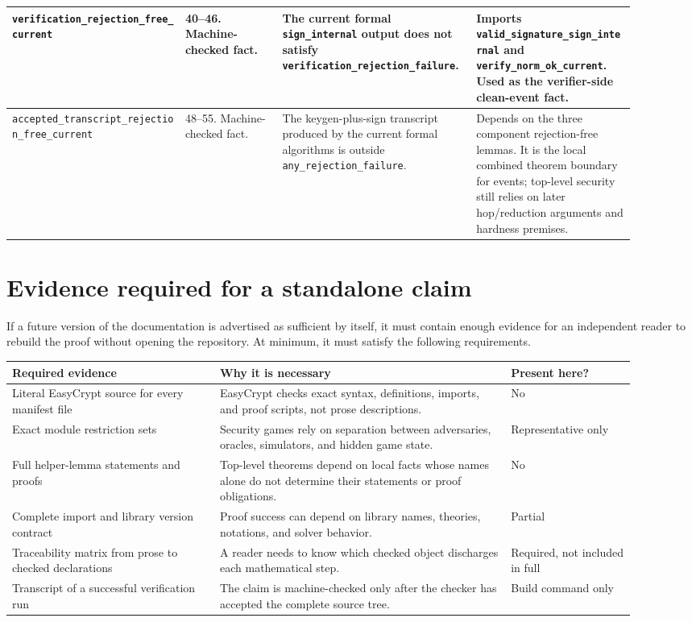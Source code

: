 \documentclass[11pt]{report}
\DeclareRobustCommand{\ec}[1]{\ifmmode\text{\nolinkurl{#1}}\else\nolinkurl{#1}\fi}
\theoremstyle{definition}
\theoremstyle{plain}
\begin{document}
{\begin{longtable}{p{0.25\linewidth}p{0.14\linewidth}p{0.28\linewidth}p{0.23\linewidth}}
\midrule
\ec{verification\_rejection\_free\_current} &
40--46. Machine-checked fact. &
The current formal \ec{sign\_internal} output does not satisfy
\ec{verification\_rejection\_failure}. &
Imports \ec{valid\_signature\_sign\_internal} and
\ec{verify\_norm\_ok\_current}.  Used as the verifier-side clean-event fact. \\
\midrule
\ec{accepted\_transcript\_rejection\_free\_current} &
48--55. Machine-checked fact. &
The keygen-plus-sign transcript produced by the current formal algorithms is
outside \ec{any\_rejection\_failure}. &
Depends on the three component rejection-free lemmas.  It is the local
combined theorem boundary for events; top-level security still relies on later
hop/reduction arguments and hardness premises. \\
\bottomrule
\end{longtable}
}

\section{Evidence required for a standalone claim}

If a future version of the documentation is advertised as sufficient by itself,
it must contain enough evidence for an independent reader to rebuild the proof
without opening the repository.  At minimum, it must satisfy the following
requirements.

\begin{longtable}{p{0.30\linewidth}p{0.42\linewidth}p{0.18\linewidth}}
\toprule
\textbf{Required evidence} & \textbf{Why it is necessary} & \textbf{Present here?} \\
\midrule
Literal EasyCrypt source for every manifest file & EasyCrypt checks exact
syntax, definitions, imports, and proof scripts, not prose descriptions. & No \\
Exact module restriction sets & Security games rely on separation between
adversaries, oracles, simulators, and hidden game state. & Representative only \\
Full helper-lemma statements and proofs & Top-level theorems depend on local
facts whose names alone do not determine their statements or proof obligations.
& No \\
Complete import and library version contract & Proof success can depend on
library names, theories, notations, and solver behavior. & Partial \\
Traceability matrix from prose to checked declarations & A reader needs to know
which checked object discharges each mathematical step. & Required, not
included in full \\
Transcript of a successful verification run & The claim is machine-checked only
after the checker has accepted the complete source tree. & Build command only \\
\bottomrule
\end{longtable}
\end{document}
